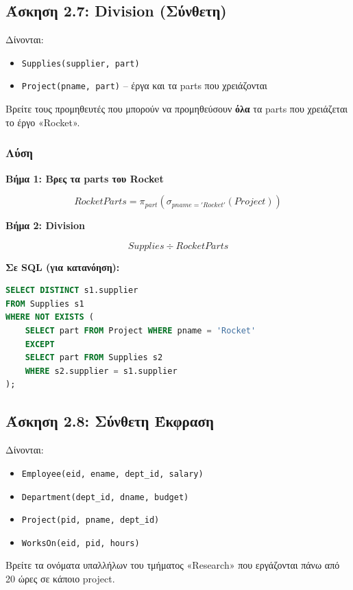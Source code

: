 \subsection{Άσκηση 2.7: Division (Σύνθετη)}

\begin{formulabox}[Εκφώνηση]
Δίνονται:
\begin{itemize}
    \item \texttt{Supplies(supplier, part)}
    \item \texttt{Project(pname, part)} -- έργα και τα parts που χρειάζονται
\end{itemize}

Βρείτε τους προμηθευτές που μπορούν να προμηθεύσουν \textbf{όλα} τα parts που
χρειάζεται το έργο «Rocket».
\end{formulabox}

\subsubsection*{Λύση}

\textbf{Βήμα 1: Βρες τα parts του Rocket}

$$RocketParts = \pi_{part}(\sigma_{pname='Rocket'}(Project))$$

\textbf{Βήμα 2: Division}

$$Supplies \div RocketParts$$

\textbf{Σε SQL (για κατανόηση):}

\begin{lstlisting}[language=SQL]
SELECT DISTINCT s1.supplier
FROM Supplies s1
WHERE NOT EXISTS (
    SELECT part FROM Project WHERE pname = 'Rocket'
    EXCEPT
    SELECT part FROM Supplies s2
    WHERE s2.supplier = s1.supplier
);
\end{lstlisting}

\subsection{Άσκηση 2.8: Σύνθετη Έκφραση}

\begin{formulabox}[Εκφώνηση]
Δίνονται:
\begin{itemize}
    \item \texttt{Employee(eid, ename, dept\_id, salary)}
    \item \texttt{Department(dept\_id, dname, budget)}
    \item \texttt{Project(pid, pname, dept\_id)}
    \item \texttt{WorksOn(eid, pid, hours)}
\end{itemize}

Βρείτε τα ονόματα υπαλλήλων του τμήματος «Research» που εργάζονται πάνω από 20 ώρες
σε κάποιο project.
\end{formulabox}

